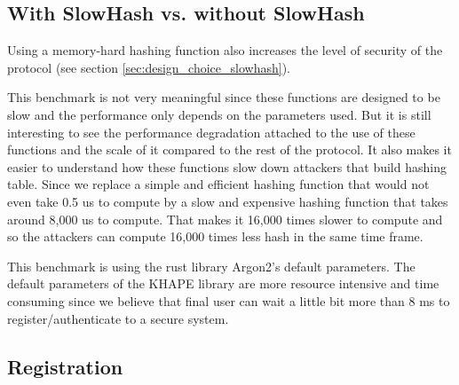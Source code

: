 ﻿\documentclass[../report.tex]{subfiles}
\begin{document}
\subsection{With SlowHash vs. without SlowHash} %


Using a memory-hard hashing function also increases the level of security of the protocol (see section \ref{sec:design_choice_slowhash}).

This benchmark is not very meaningful since these functions are designed to be slow and the performance only depends on the parameters used. But it is still interesting to see the performance degradation attached to the use of these functions and the scale of it compared to the rest of the protocol.
It also makes it easier to understand how these functions slow down attackers that build hashing table. Since we replace a simple and efficient hashing function that would not even take 0.5 us to compute by a slow and expensive hashing function that takes around 8,000 us to compute. That makes it 16,000 times slower to compute and so the attackers can compute 16,000 times less hash in the same time frame.

This benchmark is using the rust library Argon2's default parameters. The default parameters of the KHAPE library are more resource intensive and time consuming since we believe that final user can wait a little bit more than 8 ms to register/authenticate to a secure system.


\subsection*{Registration}
\end{document}
